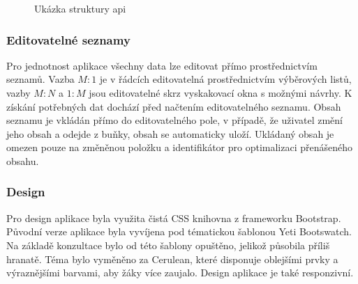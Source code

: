 \documentclass[a4paper,11pt,titlepage,fleqn]{article}
\begin{document}
            \begin{figure}[ht!]
                \caption{Ukázka struktury \gls{api}}
                \label{url-model}
            \end{figure}

        \subsubsection{Editovatelné seznamy}
            Pro jednotnost aplikace všechny data lze editovat přímo prostřednictvím seznamů. Vazba $M:1$ je v řádcích editovatelná prostřednictvím výběrových listů, vazby $M:N$ a $1:M$ jsou editovatelné skrz vyskakovací okna s možnými návrhy. K získání potřebných dat dochází před načtením editovatelného seznamu. Obsah seznamu je vkládán přímo do editovatelného pole, v případě, že uživatel změní jeho obsah a odejde z buňky, obsah se automaticky uloží. Ukládaný obsah je omezen pouze na změněnou položku a identifikátor pro optimalizaci přenášeného obsahu. 

        \subsubsection{Design}
            Pro design aplikace byla využita čistá CSS knihovna z frameworku Bootstrap. Původní verze aplikace byla vyvíjena pod tématickou šablonou Yeti Bootswatch. Na základě konzultace bylo od této šablony opuštěno, jelikož působila příliš hranatě. Téma bylo vyměněno za Cerulean, které disponuje oblejšími prvky a výraznějšími barvami, aby žáky více zaujalo. Design aplikace je také responzivní.
\end{document}
